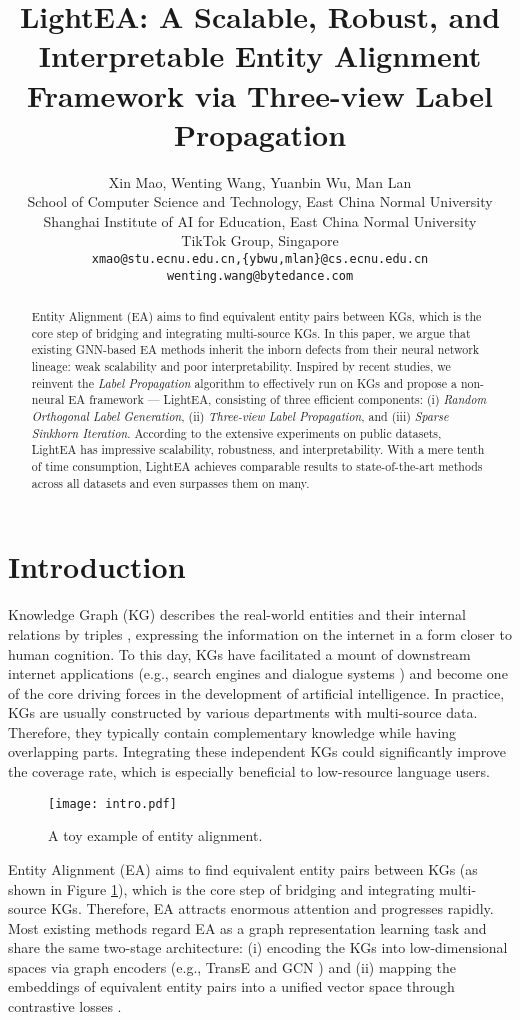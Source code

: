 \documentclass[11pt]{article}
\title{LightEA: A Scalable, Robust, and Interpretable Entity Alignment Framework via Three-view Label Propagation}
\author{Xin Mao, Wenting Wang, Yuanbin Wu, Man Lan\\
  School of Computer Science and Technology, East China Normal University \\
  Shanghai Institute of AI for Education, East China Normal University \\
  TikTok Group, Singapore\\
  \texttt{xmao@stu.ecnu.edu.cn,\{ybwu,mlan\}@cs.ecnu.edu.cn} \\ \texttt{wenting.wang@bytedance.com}}
\begin{document}
\maketitle
\begin{abstract}
Entity Alignment (EA) aims to find equivalent entity pairs between KGs, which is the core step of bridging and integrating multi-source KGs.
In this paper, we argue that existing GNN-based EA methods inherit the inborn defects from their
neural network lineage: weak scalability and poor interpretability.
Inspired by recent studies, we reinvent the \emph{Label Propagation} algorithm to effectively run on KGs and propose a non-neural EA framework --- LightEA, consisting of three efficient components: (i) \emph{Random Orthogonal Label Generation}, (ii) \emph{Three-view Label Propagation}, and (iii) \emph{Sparse Sinkhorn Iteration}.
According to the extensive experiments on public datasets, LightEA has impressive scalability, robustness, and interpretability.
With a mere tenth of time consumption, LightEA achieves comparable results to state-of-the-art methods across all datasets and even surpasses them on many.
\end{abstract}

\section{Introduction}
\label{sec:intro}

Knowledge Graph (KG) describes the real-world entities and their internal relations by triples , expressing the information on the internet in a form closer to human cognition.
To this day, KGs have facilitated a mount of downstream internet applications (e.g., search engines \cite{DBLP:conf/icde/YangAJTW19} and dialogue systems \cite{DBLP:conf/emnlp/YangZE20}) and become one of the core driving forces in the development of artificial intelligence.
In practice, KGs are usually constructed by various departments with multi-source data.
Therefore, they typically contain complementary knowledge while having overlapping parts.
Integrating these independent KGs could significantly improve the coverage rate, which is especially beneficial to low-resource language users.

\begin{figure}
    \centering
    \texttt{[image: intro.pdf]}
    \caption{A toy example of entity alignment.}
    \label{fig:intro}
\end{figure}

Entity Alignment (EA) aims to find equivalent entity pairs between KGs (as shown in Figure \ref{fig:intro}), which is the core step of bridging and integrating multi-source KGs.
Therefore, EA attracts enormous attention and progresses rapidly.
Most existing methods regard EA as a graph representation learning task and share the same two-stage architecture: (i) encoding the KGs into low-dimensional spaces via graph encoders (e.g., TransE \cite{DBLP:conf/nips/BordesUGWY13} and GCN \cite{DBLP:journals/corr/KipfW16}) and (ii) mapping the embeddings of equivalent entity pairs into a unified vector space through contrastive losses \cite{DBLP:conf/cvpr/HadsellCL06}.
\end{document}
